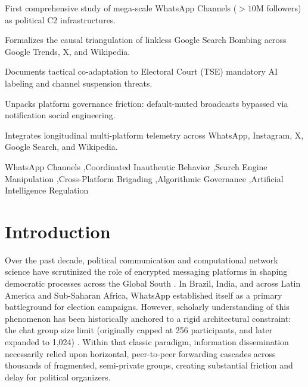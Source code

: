 \documentclass[preprint,12pt]{elsarticle}
\begin{document}
\begin{frontmatter}
\begin{highlights}
\item First comprehensive study of mega-scale WhatsApp Channels ($>10\text{M}$ followers) as political C2 infrastructures.
\item Formalizes the causal triangulation of linkless Google Search Bombing across Google Trends, X, and Wikipedia.
\item Documents tactical co-adaptation to Electoral Court (TSE) mandatory AI labeling and channel suspension threats.
\item Unpacks platform governance friction: default-muted broadcasts bypassed via notification social engineering.
\item Integrates longitudinal multi-platform telemetry across WhatsApp, Instagram, X, Google Search, and Wikipedia.
\end{highlights}

\begin{keyword}
WhatsApp Channels \sep Coordinated Inauthentic Behavior \sep Search Engine Manipulation \sep Cross-Platform Brigading \sep Algorithmic Governance \sep Artificial Intelligence Regulation
\end{keyword}

\end{frontmatter}

\section{Introduction}\label{sec:intro}

Over the past decade, political communication and computational network science have scrutinized the role of encrypted messaging platforms in shaping democratic processes across the Global South \cite{resende2019whatsapp,evangelista2019whatsapp}. In Brazil, India, and across Latin America and Sub-Saharan Africa, WhatsApp established itself as a primary battleground for election campaigns. However, scholarly understanding of this phenomenon has been historically anchored to a rigid architectural constraint: the chat group size limit (originally capped at 256 participants, and later expanded to 1,024) \cite{resende2019whatsapp}. Within that classic paradigm, information dissemination necessarily relied upon horizontal, peer-to-peer forwarding cascades across thousands of fragmented, semi-private groups, creating substantial friction and delay for political organizers.
\end{document}
